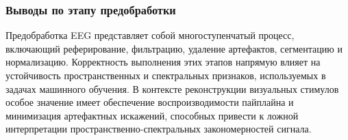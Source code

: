 \subsubsection*{Выводы по этапу предобработки}

Предобработка EEG представляет собой многоступенчатый процесс, включающий реферирование, фильтрацию, удаление артефактов, сегментацию и нормализацию. Корректность выполнения этих этапов напрямую влияет на устойчивость пространственных и спектральных признаков, используемых в задачах машинного обучения. В контексте реконструкции визуальных стимулов особое значение имеет обеспечение воспроизводимости пайплайна и минимизация артефактных искажений, способных привести к ложной интерпретации пространственно-спектральных закономерностей сигнала.
